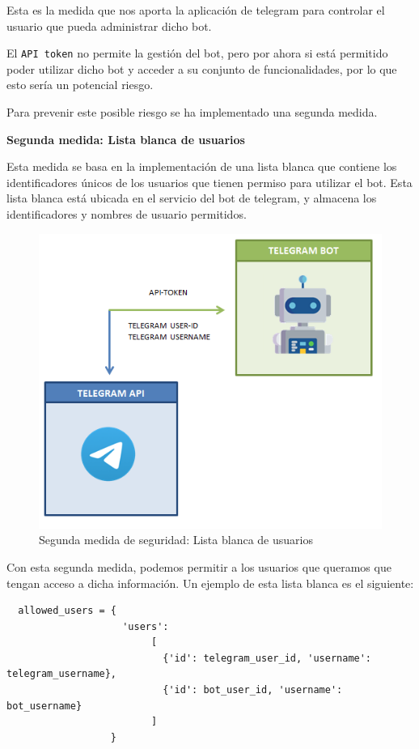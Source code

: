 Esta es la medida que nos aporta la aplicación de telegram para controlar el usuario que pueda administrar dicho bot.

El \texttt{API token} no permite la gestión del bot, pero por ahora si está permitido poder utilizar dicho bot y acceder a su conjunto de funcionalidades, por lo que esto sería un potencial riesgo.

Para prevenir este posible riesgo se ha implementado una segunda medida.

\textbf{Segunda medida: Lista blanca de usuarios}

Esta medida se basa en la implementación de una lista blanca que contiene los identificadores únicos de los usuarios que tienen permiso para utilizar el bot. Esta lista blanca está ubicada en el servicio del bot de telegram, y almacena los identificadores y nombres de usuario permitidos.

\begin{figure}[h]
	\centering
	\includegraphics[scale=0.5]{images/37}
	\caption{Segunda medida de seguridad: Lista blanca de usuarios}
	\label{img:seg2}
\end{figure}

Con esta segunda medida, podemos permitir a los usuarios que queramos que tengan acceso a dicha información. Un ejemplo de esta lista blanca es el siguiente:

\vspace{-0.5cm}

\begin{verbatim}
  allowed_users = {
  				    'users':
		                 [
		                   {'id': telegram_user_id, 'username': telegram_username}, 
		                   {'id': bot_user_id, 'username': bot_username}
		                 ]
	              }
\end{verbatim}

